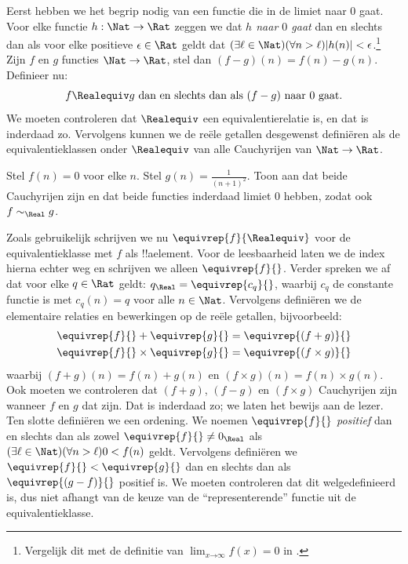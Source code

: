 \documentclass[../../../include/open-logic-section]{subfiles}
\begin{document}
Eerst hebben we het begrip nodig van een functie die in de limiet naar
$0$ gaat. Voor elke functie $h : \Nat \to \Rat$ zeggen we dat
\emph{$h$ naar $0$ gaat} dan en slechts dan als voor elke positieve
$\epsilon \in \Rat$ geldt dat $(\exists \ell \in \Nat)(\forall n >
\ell)|h(n)| < \epsilon$.\footnote{Vergelijk dit met de definitie van
$\lim_{x \mathord{\rightarrow}\infty}f(x) = 0$ in
.} Zijn $f$ en $g$ functies $\Nat \to
\Rat$, stel dan $(f-g)(n) = f(n) - g(n)$. Definieer nu:
\[
	f \Realequiv g \text{ dan en slechts dan als $(f-g)$ naar $0$ gaat}.
\]
We moeten controleren dat $\Realequiv$ een equivalentierelatie is, en
dat is inderdaad zo. Vervolgens kunnen we de reële getallen desgewenst
definiëren als de equivalentieklassen onder $\Realequiv$ van alle
Cauchyrijen van $\Nat \to \Rat$.
\begin{prob}
Stel $f(n) = 0$ voor elke $n$. Stel $g(n) = \frac{1}{(n+1)^2}$. Toon
aan dat beide Cauchyrijen zijn en dat beide functies inderdaad limiet
$0$ hebben, zodat ook $f \sim_\Real g$.
\end{prob}
Zoals gebruikelijk schrijven we nu $\equivrep{f}{\Realequiv}$ voor de
equivalentieklasse met $f$ als !!a{element}. Voor de leesbaarheid laten
we de index hierna echter weg en schrijven we alleen
$\equivrep{f}{}$. Verder spreken we af dat voor elke $q \in \Rat$
geldt: $q_{\Real} = \equivrep{c_{q}}{}$, waarbij $c_{q}$ de constante
functie is met $c_q(n) = q$ voor alle $n \in \Nat$. Vervolgens
definiëren we de elementaire relaties en bewerkingen op de reële
getallen, bijvoorbeeld:
\begin{align*}
	\equivrep{f}{} + \equivrep{g}{} &= 	\equivrep{(f + g)}{} \\
	\equivrep{f}{} \times 	\equivrep{g}{} &= \equivrep{(f \times g)}{} 
\end{align*}
waarbij $(f + g)(n) = f(n) + g(n)$ en $(f \times g)(n) = f(n) \times
g(n)$. Ook moeten we controleren dat $(f + g)$, $(f-g)$ en $(f\times
g)$ Cauchyrijen zijn wanneer $f$ en $g$ dat zijn. Dat is inderdaad zo;
we laten het bewijs aan de lezer.
Ten slotte definiëren we een ordening. We noemen $\equivrep{f}{}$
\emph{positief} dan en slechts dan als zowel $\equivrep{f}{}\neq
0_\Real$ als $(\exists \ell \in \Nat)(\forall n > \ell)0 < f(n)$
geldt. Vervolgens definiëren we $\equivrep{f}{} < \equivrep{g}{}$ dan
en slechts dan als $\equivrep{(g - f)}{}$ positief is. We moeten
controleren dat dit welgedefinieerd is, dus niet afhangt van de keuze
van de ``representerende'' functie uit de equivalentieklasse.
\end{document}
